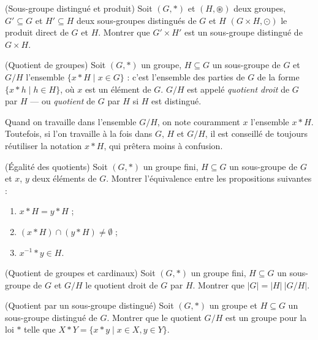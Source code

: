 \begin{exo}(Sous-groupe distingué et produit)
Soit $(G, \ast)$ et $(H, \circledast)$ deux groupes,
$G' \subseteq G$ et $H' \subseteq H$ deux sous-groupes distingués de $G$ et $H$
$(G \times H, \odot)$ le produit direct de $G$ et $H$.
Montrer que $G' \times H'$ est un sous-groupe distingué de $G \times H$.
\end{exo}

\begin{defn}(Quotient de groupes)
Soit $(G, \ast)$ un groupe, $H \subseteq G$ un sous-groupe de $G$ et
$G / H$ l'ensemble $\{x \ast H \mid x \in G\}$ : c'est l'ensemble des parties de $G$
de la forme $\{x \ast h \mid h \in H\}$, où $x$ est un élément de $G$.
$G / H$ est appelé \emph{quotient droit} de $G$ par $H$ ---
ou \emph{quotient} de $G$ par $H$ si $H$ est distingué.
\end{defn}

\begin{rem}
Quand on travaille dans l'ensemble $G / H$, on note couramment $x$ l'ensemble $x \ast H$.
Toutefois, si l'on travaille à la fois dans $G$, $H$ et $G / H$,
il est conseillé de toujours réutiliser la notation $x \ast H$,
qui prêtera moins à confusion.
\end{rem}

\begin{exo}(Égalité des quotients)
Soit $(G, \ast)$ un groupe fini, $H \subseteq G$ un sous-groupe de $G$ et
$x$, $y$ deux éléments de $G$.
Montrer l'équivalence entre les propositions suivantes :
\begin{enumerate}
\item $x \ast H = y \ast H$ ;
\item $(x \ast H) \cap (y \ast H) \neq \emptyset$ ;
\item $x^{-1} \ast y \in H$.
\end{enumerate}
\end{exo}

\begin{exo}(Quotient de groupes et cardinaux)
Soit $(G, \ast)$ un groupe fini, $H \subseteq G$ un sous-groupe de $G$ et
$G / H$ le quotient droit de $G$ par $H$.
Montrer que $\vert G \vert = \vert H \vert ~ \vert G / H \vert$.
\end{exo}

\begin{exo}(Quotient par un sous-groupe distingué)
Soit $(G, \ast)$ un groupe et $H \subseteq G$ un sous-groupe distingué de $G$.
Montrer que le quotient $G / H$ est un groupe pour la loi $\ast$ telle que
$X \ast Y = \{x \ast y \mid x \in X, y \in Y \}$.
\end{exo}

